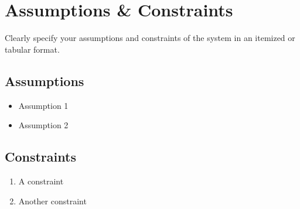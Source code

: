 \documentclass{article}
\begin{document}
\section{Assumptions \& Constraints}
\label{sec:ass-and-const}
Clearly specify your assumptions and constraints of the system in an itemized or tabular format. 
\subsection{Assumptions}
\begin{itemize}
    \item Assumption 1
    \item Assumption 2
\end{itemize}
\subsection{Constraints}
\begin{enumerate}
    \item A constraint
    \item Another constraint
\end{enumerate}
\end{document}
